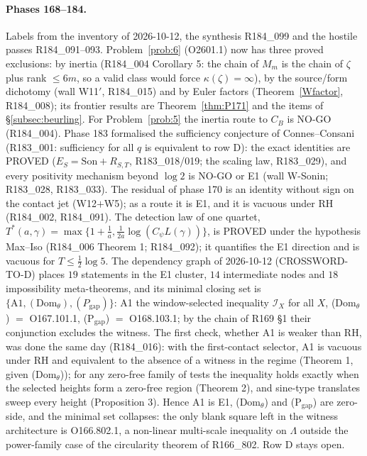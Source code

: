 \documentclass[11pt]{amsart}
\theoremstyle{definition}
\theoremstyle{remark}
\begin{document}
\paragraph{Phases 168--184.} Labels from the inventory of 2026-10-12, the synthesis R184\_099 and the hostile passes R184\_091--093.
Problem~\ref{prob:6} (O2601.1) now has three proved exclusions: by inertia (R184\_004 Corollary 5: the chain of $M_m$ is the chain of
$\zeta$ plus rank $\le6m$, so a valid class would force $\kappa(\zeta)=\infty$), by the source/form dichotomy (wall W11$'$, R184\_015) and
by Euler factors (Theorem~\ref{Wfactor}, R184\_008); its frontier results are Theorem~\ref{thm:P171} and the items of
\S\ref{subsec:beurling}. For Problem~\ref{prob:5} the inertia route to $C_B$ is NO-GO (R184\_004). Phase 183 formalised the sufficiency
conjecture of Connes--Consani (R183\_001: sufficiency for all $q$ is equivalent to row D): the exact identities are PROVED ($E_S=\mathrm{Son}+R_{S,T}$,
R183\_018/019; the scaling law, R183\_029), and every positivity mechanism beyond $\log2$ is NO-GO or E1 (wall W-Sonin; R183\_028, R183\_033).
The residual of phase 170 is an identity without sign on the contact jet (W12$+$W5); as a route it is E1, and it is vacuous under RH
(R184\_002, R184\_091). The detection law of one quartet, $T^*(a,\gamma)=\max\{1+\frac1a,\frac1{2a}\log(C_\psi L(\gamma))\}$, is PROVED under
the hypothesis Max--Iso (R184\_006 Theorem 1; R184\_092); it quantifies the E1 direction and is vacuous for $T\le\frac12\log5$. The
dependency graph of 2026-10-12 (CROSSWORD-TO-D) places $19$ statements in the E1 cluster, $14$ intermediate nodes and $18$ impossibility
meta-theorems, and its minimal closing set is $\{\mathrm{A1},(\mathrm{Dom}_\theta),(P_{\mathrm{gap}})\}$: A1 the window-selected inequality
$\mathcal I_X$ for all $X$, (Dom$_\theta$) $=$ O167.101.1, (P$_{\mathrm{gap}}$) $=$ O168.103.1; by the chain of R169 \S1 their conjunction
excludes the witness. The first check, whether A1 is weaker than RH, was done the same day (R184\_016): with the first-contact selector, A1 is vacuous under RH and equivalent to the absence of a witness in the regime (Theorem 1, given (Dom$_\theta$)); for any zero-free family of tests the inequality holds exactly when the selected heights form a zero-free region (Theorem 2), and sine-type translates sweep every height (Proposition 3). Hence A1 is E1, (Dom$_\theta$) and (P$_{\mathrm{gap}}$) are zero-side, and the minimal set collapses: the only blank square left in the witness architecture is O166.802.1, a non-linear multi-scale inequality on $\Lambda$ outside the power-family case of the circularity theorem of R166\_802. Row D stays open.
\end{document}
